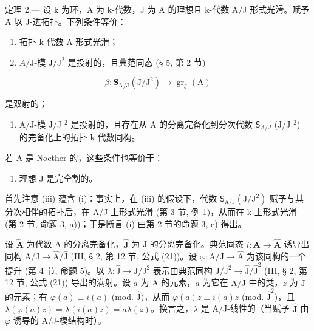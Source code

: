 定理 2.--- 设 k 为环，A 为 k-代数，J 为 A 的理想且 k-代数 A/J 形式光滑。赋予 A 以 J-进拓扑。下列条件等价：

\begin{enumerate}
\def\labelenumi{(\roman{enumi})}
\item
  拓扑 k-代数 A 形式光滑；
\item
  \(A/\mathrm{J}\)-模 \(\mathrm{J}/\mathrm{J}^2\) 是投射的，且典范同态 (§ 5, 第 2 节)
\end{enumerate}

\[
\beta : \mathbf {S} _ {\mathrm{A/J}} (\mathrm{J} / \mathrm{J} ^ {2}) \rightarrow \operatorname{gr} _ {\mathrm{J}} (\mathrm{A})
\]

是双射的；

\begin{enumerate}
\def\labelenumi{(\roman{enumi})}
\setcounter{enumi}{2}
\tightlist
\item
  A/J-模 J/J \(^{2}\) 是投射的，且存在从 A 的分离完备化到分次代数 \(\mathsf{S}_{A/J}\) (J/J \(^{2}\)) 的完备化上的拓扑 k-代数同构。
\end{enumerate}

若 A 是 Noether 的，这些条件也等价于：

\begin{enumerate}
\def\labelenumi{(\roman{enumi})}
\setcounter{enumi}{3}
\tightlist
\item
  理想 J 是完全割的。
\end{enumerate}

首先注意 (iii) 蕴含 (i)：事实上，在 (iii) 的假设下，代数 \(\mathsf{S}_{\mathrm{A}/\mathrm{J}}(\mathrm{J}/\mathrm{J}^{2})\) 赋予与其分次相伴的拓扑后，在 A/J 上形式光滑 (第 3 节, 例 1)，从而在 k 上形式光滑 (第 2 节, 命题 3, a))；于是断言 (i) 由第 2 节的命题 3, c) 得出。

设 \(\widehat{\mathbf{A}}\) 为代数 A 的分离完备化，\(\widehat{\mathbf{J}}\) 为 J 的分离完备化。典范同态 \(i: \mathbf{A} \to \widehat{\mathbf{A}}\) 诱导出同构 \(\mathrm{A} / \mathrm{J} \longrightarrow \widehat{\mathrm{A}} / \widehat{\mathrm{J}}\) (III, § 2, 第 12 节, 公式 (21))。设 \(\varphi: \mathrm{A} / \mathrm{J} \to \widehat{\mathrm{A}}\) 为该同构的一个提升 (第 4 节, 命题 5)。以 \(\lambda: \widehat{\mathrm{J}} \to \mathrm{J} / \mathrm{J}^2\) 表示由典范同构 \(\mathrm{J} / \mathrm{J}^2 \longrightarrow \widehat{\mathrm{J}} / \widehat{\mathrm{J}}^2\) (III, § 2, 第 12 节, 公式 (21)) 导出的满射。设 \(a\) 为 A 的元素，\(\bar{a}\) 为它在 \(\mathrm{A} / \mathrm{J}\) 中的类，\(z\) 为 \(\widehat{\mathrm{J}}\) 的元素；有 \(\varphi(\bar{a}) \equiv i(a)\) (mod. \(\widehat{\mathrm{J}}\))，从而 \(\varphi(\bar{a})z \equiv i(a)z\) (mod. \(\widehat{\mathrm{J}}^2\))，且 \(\lambda(\varphi(\bar{a})z) = \lambda(i(a)z) = \bar{a}\lambda(z)\)。换言之，\(\lambda\) 是 A/J-线性的（当赋予 \(\widehat{\mathbf{J}}\) 由 \(\varphi\) 诱导的 A/J-模结构时）。

